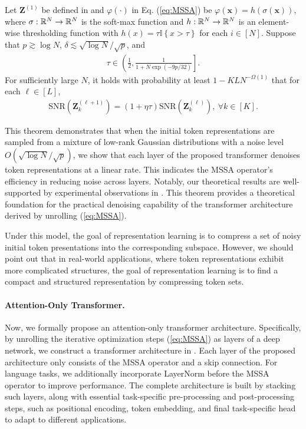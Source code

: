 \documentclass[../../book-main.tex]{subfiles}
\begin{document}
\begin{theorem}\label{thm:1}
Let $\bm Z^{(1)}$ be defined in  and $\varphi(\cdot)$ in Eq. (\ref{eq:MSSA}) be 
$\varphi(\bm x) = h\left(\sigma(\bm x)\right)$,
where $\sigma:\mathbb{R}^N \to \mathbb{R}^N$ is the soft-max function and $h:\mathbb{R}^N \to \mathbb{R}^N$ is an element-wise thresholding function with $h(x) = \tau \mathbb{I}\left\{x > \tau\right\}$ for each $i \in [N]$. Suppose that $p \gtrsim \log N$, $\delta \lesssim \sqrt{\log N}/\sqrt{p}$, and 
\begin{align*}
\tau \in \left( \frac{1}{2},  \frac{1}{1+N\exp(-9p/32)} \right].
\end{align*}
For sufficiently large $N$, it holds with probability at least $1-KLN^{-\Omega(1)}$ that for each $\ell \in [L]$, 
    \begin{align}\label{eq:SNR}
        \mathrm{SNR}(\bm Z_k^{(\ell+1)}) = (1+\eta\tau) \mathrm{SNR}(\bm Z_k^{(\ell)}),\ \forall k \in [K]. 
    \end{align}
\end{theorem}
This theorem demonstrates that when the initial token representations are sampled from a mixture of low-rank Gaussian distributions with a noise level $O(\sqrt{\log N}/\sqrt{p})$, we show that each layer of the proposed transformer denoises token representations at a linear rate. This indicates the MSSA operator's efficiency in reducing noise across layers. Notably, our theoretical results are well-supported by experimental observations in . This theorem provides a theoretical foundation for the practical denoising capability of the transformer architecture derived by unrolling (\ref{eq:MSSA}). 

\begin{remark}
    Under this model, the goal of representation learning is to compress a set of noisy initial token presentations into the corresponding subspace. However, we should point out that in real-world applications, where token representations exhibit more complicated structures, the goal of representation learning is to find a compact and structured representation by compressing token sets. 
\end{remark}


\paragraph{Attention-Only Transformer.} Now, we formally propose an attention-only transformer architecture. Specifically, by unrolling the iterative optimization steps (\ref{eq:MSSA}) as layers of a deep network, we construct a transformer architecture in . Each layer of the proposed architecture only consists of the MSSA operator and a skip connection. For language tasks, we additionally incorporate LayerNorm before the MSSA operator to improve performance. The complete architecture is built by stacking such layers, along with essential task-specific pre-processing and post-processing steps, such as positional encoding, token embedding, and final task-specific head to adapt to different applications. 
\end{document}
